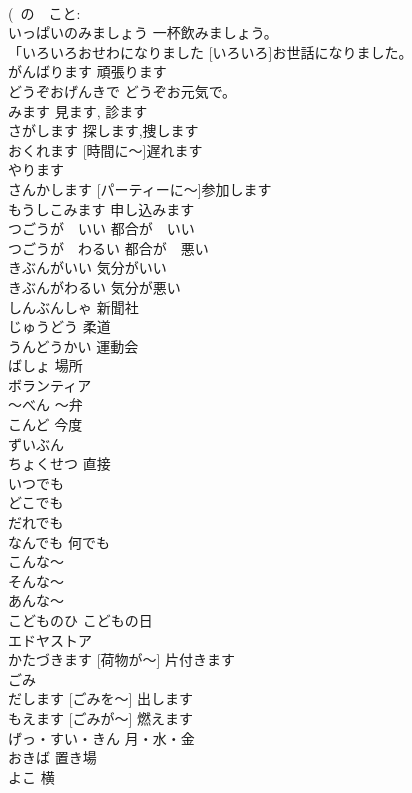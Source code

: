 \documentclass[8pt]{extreport}
\begin{document}
\begin{CJK}{UTF8}{min}
\\	(~の　こと: 
\\	いっぱいのみましょう	一杯飲みましょう。	
\\	「いろいろおせわになりました	[いろいろ]お世話になりました。	
\\	がんばります	頑張ります	
\\	どうぞおげんきで	どうぞお元気で。	
\\	みます	見ます, 診ます	
\\	さがします	探します,捜します	
\\	[じかんに～] おくれます	[時間に～]遅れます	
\\	やります			
\\	[パーティーに～]さんかします	[パーティーに～]参加します	
\\	もうしこみます	申し込みます	
\\	つごうが　いい	都合が　いい	
\\	つごうが　わるい	都合が　悪い	
\\	きぶんがいい	気分がいい	
\\	きぶんがわるい	気分が悪い	
\\	しんぶんしゃ	新聞社	
\\	じゅうどう	柔道	
\\	うんどうかい	運動会	
\\	ばしょ	場所	
\\	ボランティア			
\\	～べん	～弁	
\\	こんど	今度	
\\	ずいぶん			
\\	ちょくせつ	直接	
\\	いつでも			
\\	どこでも			
\\	だれでも			
\\	なんでも	何でも	
\\	こんな～			
\\	そんな～			
\\	あんな～			
\\	こどものひ	こどもの日	
\\	エドヤストア			
\\	[にもつが～] かたづきます	[荷物が～] 片付きます	
\\	ごみ			
\\	だします	[ごみを～] 出します	
\\	もえます	[ごみが～] 燃えます	
\\	げっ・すい・きん	月・水・金	
\\	おきば	置き場	
\\	よこ	横	

\end{CJK}
\end{document}
